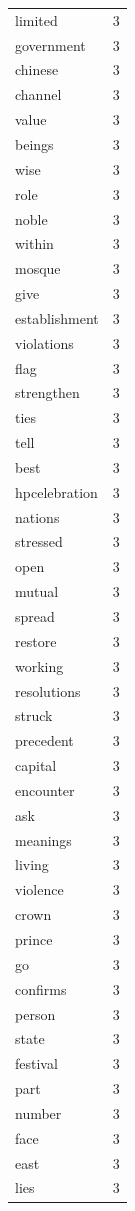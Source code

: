 \begin{tabular}{lr}
limited & 3 \\
government & 3 \\
chinese & 3 \\
channel & 3 \\
value & 3 \\
beings & 3 \\
wise & 3 \\
role & 3 \\
noble & 3 \\
within & 3 \\
mosque & 3 \\
give & 3 \\
establishment & 3 \\
violations & 3 \\
flag & 3 \\
strengthen & 3 \\
ties & 3 \\
tell & 3 \\
best & 3 \\
hpcelebration & 3 \\
nations & 3 \\
stressed & 3 \\
open & 3 \\
mutual & 3 \\
spread & 3 \\
restore & 3 \\
working & 3 \\
resolutions & 3 \\
struck & 3 \\
precedent & 3 \\
capital & 3 \\
encounter & 3 \\
ask & 3 \\
meanings & 3 \\
living & 3 \\
violence & 3 \\
crown & 3 \\
prince & 3 \\
go & 3 \\
confirms & 3 \\
person & 3 \\
state & 3 \\
festival & 3 \\
part & 3 \\
number & 3 \\
face & 3 \\
east & 3 \\
lies & 3 \\

\end{tabular}
